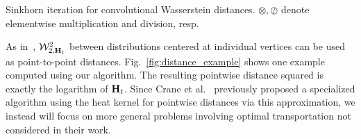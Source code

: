 \begin{algorithm}[t]
\vspace{-3mm}
\caption{Sinkhorn iteration for convolutional Wasserstein distances.  $\otimes,\oslash$ denote elementwise multiplication and division, resp.}\label{alg:sinkhorn}

\end{algorithm}
As in~\cite{solomon-2014}, $\mathcal W^2_{2,\mathbf{H}_t}$ between distributions centered at individual vertices can be used as point-to-point distances. Fig.~\ref{fig:distance_example} shows one example computed using our algorithm.  The resulting pointwise distance squared is exactly the logarithm of $\mathbf{H}_t$.  Since Crane et al.~ previously proposed a specialized algorithm using the heat kernel for pointwise distances via this approximation, we instead will focus on more general problems involving optimal transportation not considered in their work. %

